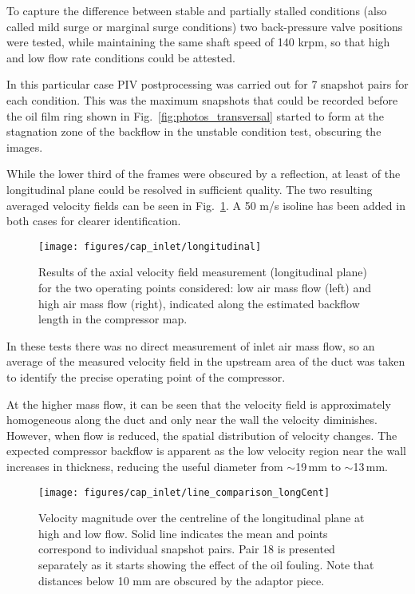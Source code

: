 To capture the difference between stable and partially stalled conditions (also called mild surge or marginal surge conditions) two back-pressure valve positions were tested, while maintaining the same shaft speed of 140 krpm, so that high and low flow rate conditions could be attested.

In this particular case PIV postprocessing was carried out for 7 snapshot pairs for each condition. This was the maximum snapshots that could be recorded before the oil film ring shown in Fig.~\ref{fig:photos_transversal} started to form at the stagnation zone of the backflow in the unstable condition test, obscuring the images.

While the lower third of the frames were obscured by a reflection, at least  of the longitudinal plane could be resolved in sufficient quality. The two resulting averaged velocity fields can be seen in Fig.~\ref{fig:longitudinal}. A 50 m/s isoline has been added in both cases for clearer identification.

\begin{figure}[t!]
\hspace{-0.1\textwidth}
\texttt{[image: figures/cap\_inlet/longitudinal]}
\caption[Axial velocity fields measured by PIV]{Results of the axial velocity field measurement (longitudinal plane) for the two operating points considered: low air mass flow (left) and high air mass flow (right), indicated along the estimated backflow length in the compressor map.}
\label{fig:longitudinal}
\end{figure}

In these tests there was no direct measurement of inlet air mass flow, so an average of the measured velocity field in the upstream area of the duct was taken to identify the precise operating point of the compressor.

At the higher mass flow, it can be seen that the velocity field is approximately homogeneous along the duct and only near the wall the velocity diminishes. However, when flow is reduced, the spatial distribution of velocity changes. The expected compressor backflow is apparent as the low velocity region near the wall increases in thickness, reducing the useful diameter from $\sim$19\,mm to $\sim$13\,mm.

\begin{figure}[t!]
\centering
\texttt{[image: figures/cap\_inlet/line\_comparison\_longCent]}
\caption[Centreline velocity in the longitudinal plane]{Velocity magnitude over the centreline of the longitudinal plane at high and low flow. Solid line indicates the mean and points correspond to individual snapshot pairs. Pair 18 is presented separately as it starts showing the effect of the oil fouling. Note that distances below 10 mm are obscured by the adaptor piece.}
\label{fig:line_comp_long}
\end{figure}

